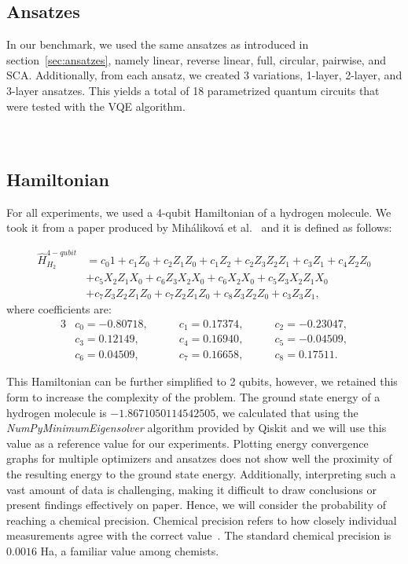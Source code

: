 \tocless\subsection{Ansatzes}\noindent
In our benchmark, we used the same ansatzes as introduced in section~\ref{sec:ansatzes}, namely linear, reverse linear, full, circular, pairwise, and SCA. Additionally, from each ansatz, we created 3 variations, 1-layer, 2-layer, and 3-layer ansatzes. This yields a total of 18 parametrized quantum circuits that were tested with the VQE algorithm.\\\\\\

\tocless\subsection{Hamiltonian}\noindent
For all experiments, we used a 4-qubit Hamiltonian of a hydrogen molecule. We took it from a paper produced by Miháliková et al.~\cite{mihalikova} and it is defined as follows:

\begin{align*}\hat{H}_{H_2}^{4-qubit} &= c_{0}1 + c_{1}Z_{0} + c_{2}Z_{1}Z_{0} + c_{1}Z_{2} + c_{2}Z_{3}Z_{2}Z_{1} + c_{3}Z_{1} + c_{4}Z_{2}Z_{0}\\
                                &+ c_{5}X_{2}Z_{1}X_{0} + c_{6}Z_{3}X_{2}X_{0} + c_{6}X_{2}X_{0} + c_{5}Z_{3}X_{2}Z_{1}X_{0}\\
                                &+c_{7}Z_{3}Z_{2}Z_{1}Z_{0} + c_{7}Z_{2}Z_{1}Z_{0} + c_{8}Z_{3}Z_{2}Z_{0} + c_{3}Z_{3}Z_{1}\text{,}
\end{align*}
where coefficients are:
\begin{alignat*}{3}
    &c_0 = -0.80718,\qquad &c_1 = 0.17374,\qquad &c_2 =-0.23047, \\
    &c_3 = 0.12149,\qquad  &c_4 = 0.16940,\qquad &c_5 = -0.04509, \\
    &c_6 = 0.04509,\qquad  &c_7 = 0.16658,\qquad &c_8 = 0.17511.
\end{alignat*}

This Hamiltonian can be further simplified to 2 qubits, however, we retained this form to increase the complexity of the problem. The ground state energy of a hydrogen molecule is $-1.8671050114542505$, we calculated that using the \textit{NumPyMinimumEigensolver} algorithm provided by Qiskit and we will use this value as a reference value for our experiments. Plotting energy convergence graphs for multiple optimizers and ansatzes does not show well the proximity of the resulting energy to the ground state energy. Additionally, interpreting such a vast amount of data is challenging, making it difficult to draw conclusions or present findings effectively on paper. Hence, we will consider the probability of reaching a chemical precision. Chemical precision refers to how closely individual measurements agree with the correct value~\cite{chemistry}. The standard chemical precision is $0.0016$ Ha, a familiar value among chemists.\\

